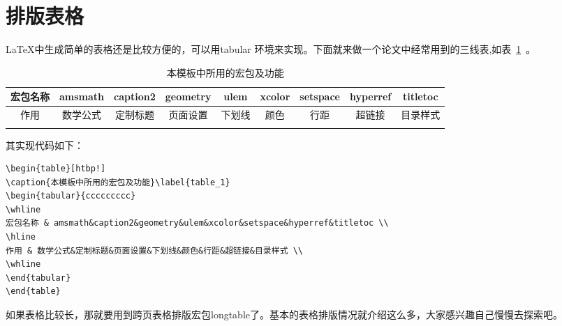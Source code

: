 \section{排版表格}
\LaTeX 中生成简单的表格还是比较方便的，可以用tabular 环境来实现。下面就来做一个论文中经常用到的三线表,如表~\ref{table_1}~。

\begin{table}[htbp!]

\caption{本模板中所用的宏包及功能}\label{table_1}

\begin{tabular}{ccccccccc}
\whline 
宏包名称 & amsmath&caption2&geometry&ulem&xcolor&setspace&hyperref&titletoc \\ 
\hline 
作用 & 数学公式&定制标题&页面设置&下划线&颜色&行距&超链接&目录样式 \\ 
\whline 
\end{tabular}
\end{table}

其实现代码如下：
{\color{green!50!black}
\begin{verbatim}
\begin{table}[htbp!]
\caption{本模板中所用的宏包及功能}\label{table_1}
\begin{tabular}{ccccccccc}
\whline 
宏包名称 & amsmath&caption2&geometry&ulem&xcolor&setspace&hyperref&titletoc \\ 
\hline 
作用 & 数学公式&定制标题&页面设置&下划线&颜色&行距&超链接&目录样式 \\ 
\whline 
\end{tabular}
\end{table}
\end{verbatim}
}
如果表格比较长，那就要用到跨页表格排版宏包longtable了。基本的表格排版情况就介绍这么多，大家感兴趣自己慢慢去探索吧。